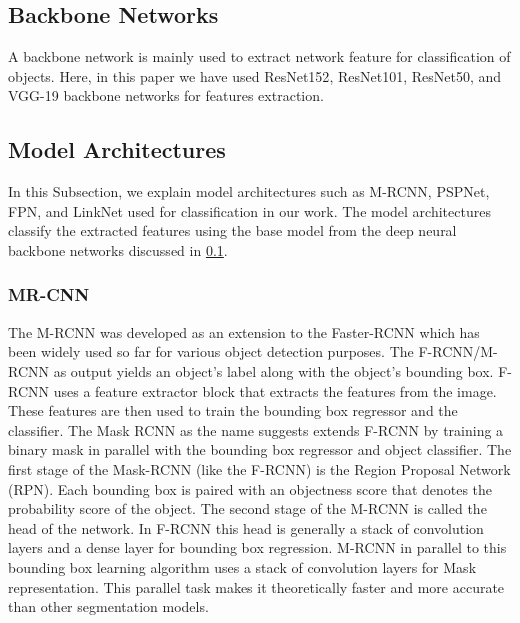 \documentclass[a4paper,12pt]{spieman}  %
\begin{document}
\begin{spacing}{1}
\subsection{Backbone Networks}
\label{BNs}
A backbone network is mainly used to extract network feature for classification of objects. Here, in this paper we have used ResNet152\cite{he2016deep}, ResNet101\cite{Xie2016}, ResNet50, and VGG-19\cite{simonyan2014very} backbone networks for features extraction.
\subsection{Model Architectures}
In this Subsection, we explain model architectures such as M-RCNN, PSPNet, FPN, and LinkNet used for classification in our work. The model architectures classify the extracted features using the base model from the deep neural backbone networks discussed in \ref{BNs}.
\subsubsection{MR-CNN}
The M-RCNN \cite{7900179} was developed as an extension to the Faster-RCNN \cite{ren2015faster} which has been widely used so far for various object detection purposes. The F-RCNN/M-RCNN as output yields an object’s label along with the object’s bounding box. F-RCNN uses a feature extractor block that extracts the features from the image. These features are then used to train the bounding box regressor and the classifier. The Mask RCNN as the name suggests extends F-RCNN by training a binary mask in parallel with the bounding box regressor and object classifier.
The first stage of the Mask-RCNN (like the F-RCNN) is the Region Proposal Network (RPN). Each bounding box is paired with an objectness score that denotes the probability score of the object. The second stage of the M-RCNN is called the head of the network. In F-RCNN this head is generally a stack of convolution layers and a dense layer for bounding box regression. M-RCNN in parallel to this bounding box learning algorithm uses a stack of convolution layers for Mask representation. This parallel task makes it theoretically faster and more accurate than other segmentation models.

\end{spacing}
\end{document}
